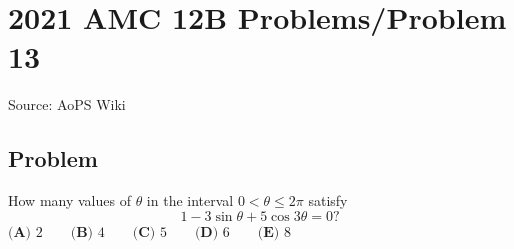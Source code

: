 \documentclass[12pt]{article}
\begin{document}
\section*{{2021 AMC 12B Problems/Problem 13}}
Source: AoPS Wiki

\subsection*{Problem}
How many values of $\theta$ in the interval $0<\theta\le 2\pi$ satisfy \[1-3\sin\theta+5\cos3\theta = 0?\] $\textbf{(A) }2 \qquad \textbf{(B) }4 \qquad \textbf{(C) }5\qquad \textbf{(D) }6 \qquad \textbf{(E) }8$
\end{document}
